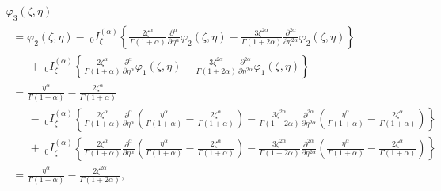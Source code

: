 \documentclass[10pt]{NSP1}
\begin{document}
\begin{equation}
\label{eq46}
\begin{array}{llllll}
 \varphi _3 \left( {\zeta ,\eta } \right) \\
\;\; =\varphi _2 \left( {\zeta ,\eta } \right)-\;_0I_\zeta ^{\left( \alpha
\right)}\left\{ {\frac{2\zeta ^\alpha }{\Gamma \left( {1+\alpha }
\right)}\frac{\partial ^\alpha }{\partial \eta ^\alpha }\varphi _2 \left(
{\zeta ,\eta } \right)-\frac{3\zeta ^{2\alpha }}{\Gamma \left( {1+2\alpha }
\right)}\frac{\partial ^{2\alpha }}{\partial \eta ^{2\alpha }}\varphi _2
\left( {\zeta ,\eta } \right)} \right\} \\
\qquad +\;_0I_\zeta ^{\left( \alpha \right)}\left\{ {\frac{2\zeta ^\alpha
}{\Gamma \left( {1+\alpha } \right)}\frac{\partial ^\alpha }{\partial \eta
^\alpha }\varphi _1 \left( {\zeta ,\eta } \right)-\frac{3\zeta ^{2\alpha
}}{\Gamma \left( {1+2\alpha } \right)}\frac{\partial ^{2\alpha }}{\partial
\eta ^{2\alpha }}\varphi _1 \left( {\zeta ,\eta } \right)} \right\} \\
\;\; =\frac{\eta ^\alpha }{\Gamma \left( {1+\alpha } \right)}-\frac{2\zeta
^\alpha }{\Gamma \left( {1+\alpha } \right)} \\
\qquad -\;_0I_\zeta ^{\left( \alpha \right)}\left\{ {\frac{2\zeta ^\alpha
}{\Gamma \left( {1+\alpha } \right)}\frac{\partial ^\alpha }{\partial \eta
^\alpha }\left( {\frac{\eta ^\alpha }{\Gamma \left( {1+\alpha }
\right)}-\frac{2\zeta ^\alpha }{\Gamma \left( {1+\alpha } \right)}}
\right)-\frac{3\zeta ^{2\alpha }}{\Gamma \left( {1+2\alpha }
\right)}\frac{\partial ^{2\alpha }}{\partial \eta ^{2\alpha }}\left(
{\frac{\eta ^\alpha }{\Gamma \left( {1+\alpha } \right)}-\frac{2\zeta
^\alpha }{\Gamma \left( {1+\alpha } \right)}} \right)} \right\} \\
\qquad +\;_0I_\zeta ^{\left( \alpha \right)}\left\{ {\frac{2\zeta ^\alpha
}{\Gamma \left( {1+\alpha } \right)}\frac{\partial ^\alpha }{\partial \eta
^\alpha }\left( {\frac{\eta ^\alpha }{\Gamma \left( {1+\alpha }
\right)}-\frac{2\zeta ^\alpha }{\Gamma \left( {1+\alpha } \right)}}
\right)-\frac{3\zeta ^{2\alpha }}{\Gamma \left( {1+2\alpha }
\right)}\frac{\partial ^{2\alpha }}{\partial \eta ^{2\alpha }}\left(
{\frac{\eta ^\alpha }{\Gamma \left( {1+\alpha } \right)}-\frac{2\zeta
^\alpha }{\Gamma \left( {1+\alpha } \right)}} \right)} \right\} \\
\;\; =\frac{\eta ^\alpha }{\Gamma \left( {1+\alpha } \right)}-\frac{2\zeta
^{2\alpha }}{\Gamma \left( {1+2\alpha } \right)},
 \end{array}
\end{equation}
\end{document}
